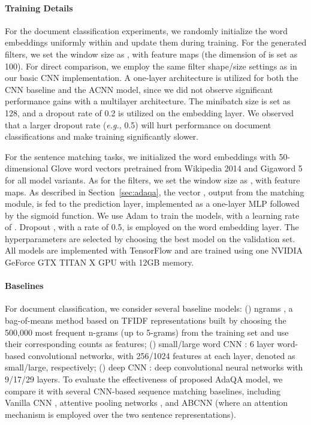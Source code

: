 \documentclass[11pt,a4paper]{article}
\begin{document}
\paragraph{Training Details}
For the document classification experiments, we randomly initialize the word embeddings uniformly within  and update them during training. For the generated filters, we set the window size as , with  feature maps (the dimension of  is set as 100). For direct comparison, we employ the same filter shape/size settings as in our basic CNN implementation. A one-layer architecture is utilized for both the CNN baseline and the ACNN model, since we did not observe significant performance gains with a multilayer architecture. 
The minibatch size is set as 128, and a dropout rate of 0.2 is utilized on the embedding layer. We observed that a larger dropout rate (\emph{e.g.}, 0.5) will hurt performance on document classifications and make training significantly slower. 

For the sentence matching tasks, we initialized the word embeddings with 50-dimensional Glove \citep{pennington2014glove} 
word vectors pretrained from Wikipedia 2014 and Gigaword 5 \citep{pennington2014glove} for all model variants. As for the filters, we set the window size as , with  feature maps. As described in Section~\ref{sec:adaqa}, the vector , output from the matching module, is fed to the prediction layer, implemented as a one-layer MLP followed by the sigmoid function. We use Adam \citep{kingma2014adam} to train the models, with a learning rate of . Dropout \citep{srivastava2014dropout}, with a rate of 0.5, is employed on the word embedding layer. The hyperparameters are selected by choosing the best model on the validation set. All models are implemented with TensorFlow \cite{abadi2016tensorflow} and are trained using one NVIDIA GeForce GTX TITAN X GPU with 12GB memory. \par
\paragraph{Baselines}
For document classification, we consider several baseline models: () ngrams \citep{zhang2015character}, a bag-of-means method based on TFIDF representations built by choosing the 500,000 most frequent n-grams (up to 5-grams) from the training set and use their corresponding counts as features; 
() small/large word CNN \citep{zhang2015character}: 6 layer word-based convolutional networks, with 256/1024 features at each layer, denoted as small/large, respectively;
() deep CNN \citep{conneau2016very}: deep convolutional neural networks with 9/17/29 layers.
To evaluate the effectiveness of proposed AdaQA model, we compare it with several CNN-based sequence matching baselines, including Vanilla CNN \citep{jurczyk2016selqa,santos2017learning}, attentive pooling networks \citep{dos2016attentive}, and ABCNN \citep{yin2015abcnn} (where an attention mechanism is employed over the two sentence representations).
\end{document}
